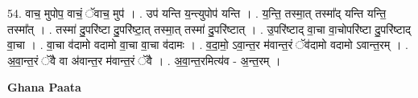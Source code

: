 \documentclass[17pt]{extarticle}
\begin{document}
54. वाच॒ मुपोप॒ वाचं॒ ॅवाच॒ मुप॑ । . उप॑ यन्ति य॒न्त्युपोप॑ यन्ति । . य॒न्ति॒ तस्मा॒त् तस्मा᳚द् यन्ति यन्ति॒ तस्मा᳚त् । . तस्मा॑ दु॒परि॑ष्टा दु॒परि॑ष्टा॒त् तस्मा॒त् तस्मा॑ दु॒परि॑ष्टात् । . उ॒परि॑ष्टाद् वा॒चा वा॒चोपरि॑ष्टा दु॒परि॑ष्टाद् वा॒चा । . वा॒चा व॑दामो वदामो वा॒चा वा॒चा व॑दामः । . व॒दा॒मो॒ ऽवा॒न्त॒र म॑वान्त॒रं ॅव॑दामो वदामो ऽवान्त॒रम् । . अ॒वा॒न्त॒रं ॅवै वा अ॑वान्त॒र म॑वान्त॒रं ॅवै । . अ॒वा॒न्त॒रमित्य॑व - अ॒न्त॒रम् । \newline

\textbf{Ghana Paata } \newline
\end{document}
